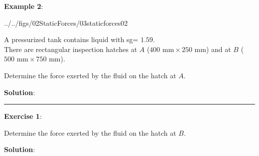 \documentclass[10pt,onesided]{amsart}
\begin{document}
\vfill\newpage



\begin{minipage}[t]{0.5\textwidth}
	\raggedright
	\textbf{Example 2}:\parb
	\bigskip
	\begin{cfig}[0.45]{../../figs/02StaticForces/03staticforces02}\end{cfig}
	A pressurized tank contains liquid with sg= $1.59$. \\
	There are rectangular inspection hatches at $A$ ($400\text{ mm}\times 250\text{ mm}$) and at $B$ ($500\text{ mm}\times 750\text{ mm}$).
	\par\medskip
	Determine the force exerted by the fluid on the hatch at $A$.
\end{minipage}
\hfill
\begin{minipage}[t]{0.45\textwidth}
	\textbf{Solution}:
	\par\bigskip
\end{minipage}
\parb
\rule{\textwidth}{0.02in}
\parb

\begin{minipage}[t]{0.5\textwidth}
	\raggedright
	\textbf{Exercise 1}:\parb
	
	Determine the force exerted by the fluid on the hatch at $B$.
\end{minipage}
\hfill
\begin{minipage}[t]{0.45\textwidth}
	\textbf{Solution}:
	\parb
\end{minipage}
\end{document}
